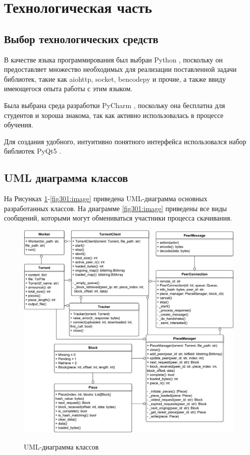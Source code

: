 \section{Технологическая часть}

\subsection{Выбор технологических средств}
В качестве языка программирования был выбран Python \cite{python}, поскольку он предоставляет множество необходимых для реализации поставленной задачи библиотек, такие как aiohttp, socket, bencodepy и прочие, а также ввиду имеющегося опыта работы с этим языком. 

Была выбрана среда разработки PyCharm \cite{pycharm}, поскольку она бесплатна для студентов и хороша знакома, так как активно использовалась в процессе обучения.

Для создания удобного, интуитивно понятного интерфейса использовался набор библиотек PyQt5 \cite{pyqt}. \newline

\subsection{UML диаграмма классов}
На Рисунках \ref{fig300:image}-\ref{fig301:image} приведена UML-диаграмма основных разработанных классов. На диаграмме \ref{fig301:image} приведены все виды сообщений, которыми могут обмениваться участники процесса скачивания.

\newpage

\begin{figure}[h!]
	\begin{center}
		{\includegraphics[scale = 0.57]{img/uml.pdf}}
		\caption{UML-диаграмма классов}
		\label{fig300:image}
	\end{center}
\end{figure}

